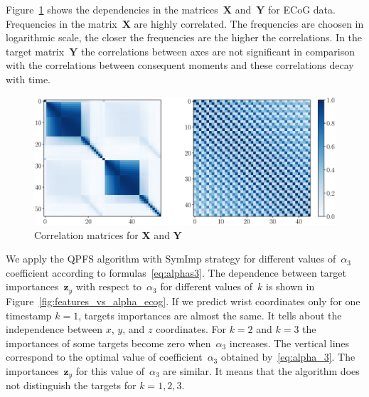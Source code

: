 \documentclass[12pt,twoside]{article}
\theoremstyle{definition}
\newcommand{\bz}{\mathbf{z}}
\newcommand{\bY}{\mathbf{Y}}
\newcommand{\bX}{\mathbf{X}}
\begin{document}
Figure~\ref{fig:corr_matrix} shows the dependencies in the matrices~$\bX$ and~$\bY$ for ECoG data. Frequencies in the matrix~$\bX$ are highly correlated. 
The frequencies are choosen in logarithmic scale, the closer the frequencies are the higher the correlations.
In the target matrix~$\bY$ the correlations between axes are not significant in comparison with the correlations between consequent moments and these correlations decay with time.
\begin{figure}[h]
	\includegraphics[width=\linewidth]{figs/corr_matrix.eps}
	\caption{Correlation matrices for $\bX$ and $\bY$}
	\label{fig:corr_matrix}
\end{figure}

We apply the QPFS algorithm with SymImp strategy for different values of~$\alpha_3$ coefficient according to formulas~\eqref{eq:alphas3}.
The dependence between target importances~$\bz_y$ with respect to~$\alpha_3$ for different values of~$k$ is shown in Figure~\ref{fig:features_vs_alpha_ecog}.
If we predict wrist coordinates only for one timestamp $k = 1$, targets importances are almost the same.
It tells about the independence between $x$, $y$, and $z$ coordinates.
For $k = 2$ and $k = 3$ the importances of some targets become zero when~$\alpha_3$ increases.
The vertical lines correspond to the optimal value of coefficient~$\alpha_3$ obtained by~\eqref{eq:alpha_3}. 
The importances~$\bz_y$ for this value of~$\alpha_3$ are similar. 
It means that the algorithm does not distinguish the targets for $k=1, 2, 3$.
\end{document}
